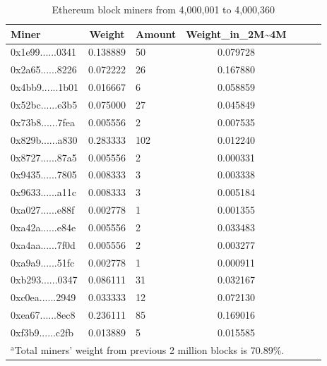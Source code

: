 \documentclass[conference]{IEEEtran}
\begin{document}
\begin{table}[htbp]
\caption{Ethereum block miners from 4,000,001 to 4,000,360}
\begin{center}
\begin{tabular}{lclclcl}
\hline
Miner                                      & Weight   & Amount & Weight\_in\_2M\textasciitilde4M \\
\hline
0x1e99......0341 & 0.138889 & 50 & 0.079728  \\
0x2a65......8226 & 0.072222 & 26 & 0.167880  \\
0x4bb9......1b01 & 0.016667 & 6 & 0.058859  \\
0x52bc......e3b5 & 0.075000 & 27 & 0.045849  \\
0x73b8......7fea & 0.005556 & 2 & 0.007535  \\
0x829b......a830 & 0.283333 & 102 & 0.012240  \\
0x8727......87a5 & 0.005556 & 2 & 0.000331  \\
0x9435......7805 & 0.008333 & 3 & 0.003338  \\
0x9633......a11c & 0.008333 & 3 & 0.005184  \\
0xa027......e88f & 0.002778 & 1 & 0.001355  \\
0xa42a......e84e & 0.005556 & 2 & 0.033483  \\
0xa4aa......7f0d & 0.005556 & 2 & 0.003277  \\
0xa9a9......51fc & 0.002778 & 1 & 0.000911  \\
0xb293......0347 & 0.086111	 & 31 & 0.032167  \\
0xc0ea......2949 & 0.033333 & 12 & 0.072130  \\
0xea67......8ec8 & 0.236111 & 85 & 0.169016  \\
0xf3b9......c2fb & 0.013889 & 5 & 0.015585  \\

\hline
\multicolumn{4}{l}{$^{\mathrm{a}}$Total miners' weight from previous 2 million blocks is 70.89\%.}
\end{tabular}
\end{center}
\end{table}
\end{document}
